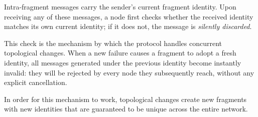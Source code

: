 Intra-fragment messages carry the sender's current fragment identity. Upon receiving any
of these messages, a node first checks whether the received identity matches its own
current identity; if it does not, the message is \emph{silently discarded}.

This check is the mechanism by which the protocol handles concurrent topological changes.
When a new failure causes a fragment to adopt a fresh identity, all messages generated
under the previous identity become instantly invalid: they will be rejected by every node
they subsequently reach, without any explicit cancellation.

In order for this mechanism to work, topological changes create new fragments with new
identities that are guaranteed to be unique across the entire network. %

